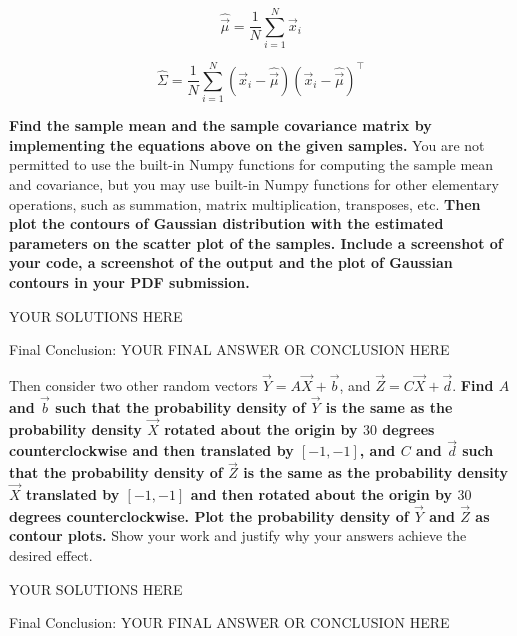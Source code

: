 \begin{equation}
    \widehat{\vec{\mu}}=\frac{1}{N} \sum_{i=1}^{N} \vec{x}_{i}
\end{equation}

\begin{equation}
    \widehat{\Sigma} = \frac{1}{N} \sum_{i=1}^{N}\left(\vec{x}_{i}-\widehat{\vec{\mu}}\right)\left(\vec{x}_{i}-\widehat{\vec{\mu}}\right)^\top
\end{equation}

\textbf{Find the sample mean and the sample covariance matrix by implementing the equations above on the given samples.} You are not permitted to use the built-in Numpy functions for computing the sample mean and covariance, but you may use built-in Numpy functions for other elementary operations, such as summation, matrix multiplication, transposes, etc. \textbf{Then plot the contours of Gaussian distribution with the estimated parameters on the scatter plot of the samples. Include a screenshot of your code, a screenshot of the output and the plot of Gaussian contours in your PDF submission. }

\begin{solution}

YOUR SOLUTIONS HERE

{\color{red} Final Conclusion: YOUR FINAL ANSWER OR CONCLUSION HERE}

\end{solution}

\qpart{[5 points]}

Then consider two other random vectors $\vec{Y} = A\vec{X} + \vec{b}$, and $\vec{Z} = C\vec{X} + \vec{d}$. \textbf{Find $A$ and $\vec{b}$ such that the probability density of $\vec{Y}$ is the same as the probability density $\vec{X}$ rotated about the origin by $30$ degrees counterclockwise and then translated by $[-1, -1]$, and $C$ and $\vec{d}$ such that the probability density of $\vec{Z}$ is the same as the probability density $\vec{X}$ translated by $[-1, -1]$ and then rotated about the origin by $30$ degrees counterclockwise. Plot the probability density of $\vec{Y}$ and $\vec{Z}$ as contour plots.} Show your work and justify why your answers achieve the desired effect. 

\begin{solution}

YOUR SOLUTIONS HERE

{\color{red} Final Conclusion: YOUR FINAL ANSWER OR CONCLUSION HERE}

\end{solution}

